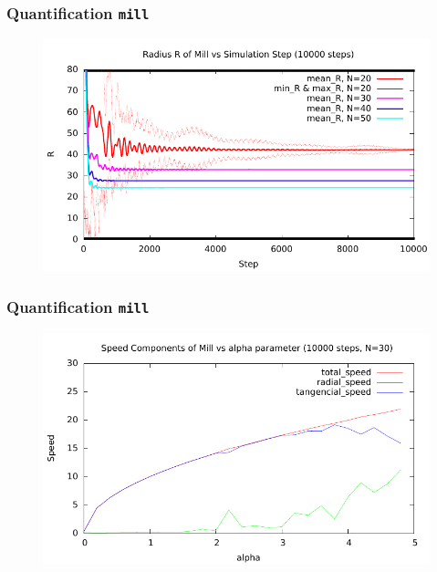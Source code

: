 \documentclass[compress]{beamer}
\begin{document}
\begin{frame}
	\frametitle{Quantification \texttt{mill}}	
	\begin{figure}[H]
		\includegraphics[width=1. \columnwidth]{../plots/mill_II_radius_dt_allN.pdf}
	\end{figure}	
\end{frame}



\begin{frame}
	\frametitle{Quantification \texttt{mill}}	
	\begin{figure}[H]
		\includegraphics[width=1. \columnwidth]{../plots/mill_II_speeds_alpha_10000.pdf}
	\end{figure}	
\end{frame}
\end{document}
